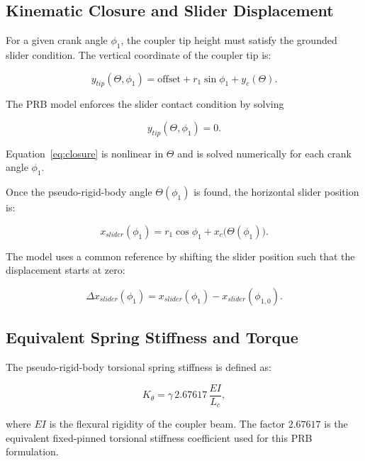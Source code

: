 \documentclass[colorlinks,upint,subscriptcorrection,varvw,hyphenate]{asmeconf}
\begin{document}
\subsection{Kinematic Closure and Slider Displacement}
For a given crank angle $\phi_1$, the coupler tip height must satisfy the grounded slider condition. The vertical coordinate of the coupler tip is:

\begin{equation}
    y_{tip}(\Theta, \phi_1) = \text{offset} + r_1 \sin \phi_1 + y_c(\Theta).
\end{equation}

The PRB model enforces the slider contact condition by solving

\begin{equation}
    y_{tip}(\Theta, \phi_1) = 0.
    \label{eq:closure}
\end{equation}

Equation~\eqref{eq:closure} is nonlinear in $\Theta$ and is solved numerically for each crank angle $\phi_1$.

Once the pseudo-rigid-body angle $\Theta(\phi_1)$ is found, the horizontal slider position is:

\begin{equation}
    x_{slider}(\phi_1) = r_1 \cos \phi_1 + x_c\bigl(\Theta(\phi_1)\bigr).
\end{equation}

The model uses a common reference by shifting the slider position such that the displacement starts at zero:

\begin{equation}
    \Delta x_{slider}(\phi_1) = x_{slider}(\phi_1) - x_{slider}(\phi_{1,0}).
\end{equation}

\subsection{Equivalent Spring Stiffness and Torque}

The pseudo-rigid-body torsional spring stiffness is defined as:

\begin{equation}
    K_{\theta} = \gamma \, 2.67617 \, \frac{EI}{L_c},
    \label{eq:Kt}
\end{equation}

where $EI$ is the flexural rigidity of the coupler beam. The factor $2.67617$ is the equivalent fixed-pinned torsional stiffness coefficient used for this PRB formulation.
\end{document}
